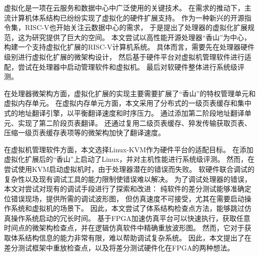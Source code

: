 \begin{cabstract}
虚拟化是一项在云服务和数据中心中广泛使用的关键技术。
在需求的推动下，主流计算机体系结构已纷纷实现了虚拟化的硬件扩展支持。
作为一种新兴的开源指令集，RISC-V也开始关注云数据中心的需求，
于是提出了处理器的虚拟化扩展规范，这为研究提供了巨大的空间。
本文尝试以高性能开源处理器“香山”为中心，构建一个支持虚拟化扩展的RISC-V计算机系统。
具体而言，需要先在处理器硬件级别进行虚拟化扩展的微架构设计，
然后基于硬件平台对虚拟机管理软件进行适配，尝试在处理器中启动管理软件和虚拟机。
最后对软硬件整体进行系统级评测。

在处理器微架构方面，虚拟化扩展的实现主要需要扩展了“香山”的特权管理单元和虚拟内存单元。
在虚拟内存单元方面，本文采用了分布式的一级页表缓存和集中式的地址翻译引擎，以平衡翻译速度和时序压力。
通过添加第二阶段地址翻译单元、实现了第二阶段页表翻译。
还通过复用二级页表缓存、猝发传输获取页表、压缩一级页表缓存表项等的微架构加快了翻译速度。

在虚拟机管理软件方面，本文选择Linux-KVM作为硬件平台的适配目标。
在添加虚拟化扩展后的“香山”上启动了Linux，并对主机性能进行系统级评测。
然而，在尝试使用KVM启动虚拟机时，由于处理器潜在的错误而失败。
软硬件联合调试的复杂性以及现有调试工具的能力限制使错误难以解决。
为了调试处理器的错误，本文对尝试对现有的调试手段进行了探索和改进：
纯软件的差分测试能够准确定位错误现场，提供所需的调试波形图，
但仿真速度不可接受，尤其在需要启动操作系统和虚拟机的场景下。
因此，本文尝试了体系结构检查点方法，能够跳过仿真操作系统启动的冗长时间。
基于FPGA加速仿真平台可以快速执行，获取任意时间点的微架构检查点，并在逻辑仿真软件中精确重放波形图。
然而，它对于获取体系结构信息的能力非常有限，难以帮助调试复杂系统。
因此，本文提出了在差分测试框架中重放检查点，以及将差分测试硬件化在FPGA的两种想法。

\end{cabstract}


